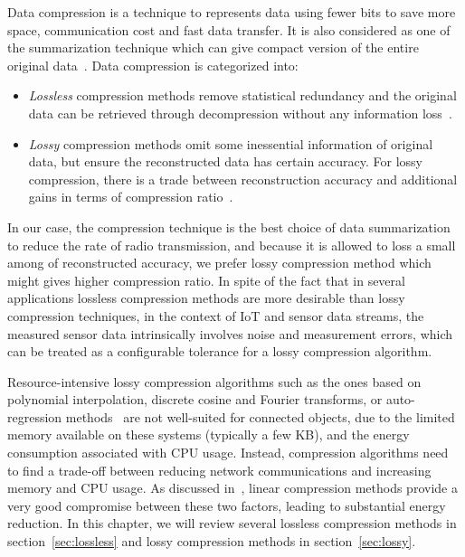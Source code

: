 Data compression is a technique to represents data using fewer bits to save more
space, communication cost and fast data transfer. It is also considered as one
of the summarization technique which can give compact version of the entire
original data~\cite{hesabi2015data}. Data compression is categorized into:
\begin{itemize}
    \item \emph{Lossless} compression methods remove statistical redundancy and
    the original data can be retrieved through decompression without any
    information loss~\cite{hesabi2015data}.
    \item \emph{Lossy} compression methods omit some inessential information of
    original data, but ensure the reconstructed data has certain accuracy. For
    lossy compression, there is a trade between reconstruction accuracy and
    additional gains in terms of compression ratio~\cite{zordan2014performance}.
\end{itemize}

In our case, the compression technique is the best choice of data summarization
to reduce the rate of radio transmission, and because it is allowed to loss a
small among of reconstructed accuracy, we prefer lossy compression method which
might gives higher compression ratio. In spite of the fact that in several
applications lossless compression methods are more desirable than lossy
compression techniques, in the  context of IoT and sensor data streams, the
measured sensor data  intrinsically involves noise and measurement errors, which
can  be treated as a configurable tolerance for a lossy compression algorithm. 

Resource-intensive lossy compression algorithms such as the ones based on
polynomial interpolation, discrete cosine and Fourier transforms, or
auto-regression methods~\cite{lu2010optimized} are not well-suited for
connected objects, due to the limited memory available on  these systems
(typically a few KB), and the energy consumption  associated with CPU usage.
Instead, compression algorithms need  to find a trade-off between reducing
network communications and  increasing memory and CPU usage. As  discussed
in~\cite{zordan2014performance}, linear compression methods  provide a very good
compromise between these two factors, leading to  substantial energy reduction.
In this chapter, we will review several lossless compression methods in
section~\ref{sec:lossless} and lossy compression methods in
section~\ref{sec:lossy}.
